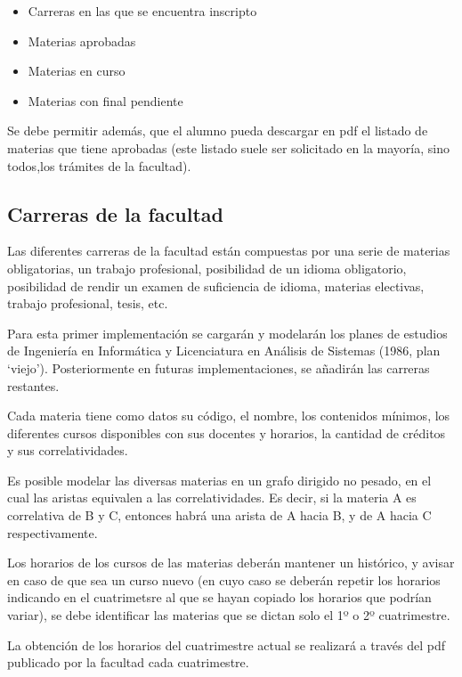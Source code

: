 \documentclass[a4paper]{article}
\begin{document}
\begin{itemize}
	\item Carreras en las que se encuentra inscripto
	\item Materias aprobadas
	\item Materias en curso
	\item Materias con final pendiente
\end{itemize}

Se debe permitir además, que el alumno pueda descargar en pdf el listado de materias que tiene aprobadas (este listado suele ser solicitado en la mayoría, sino todos,los trámites de la facultad).

\subsection{Carreras de la facultad}

Las diferentes carreras de la facultad están compuestas por una serie de materias obligatorias, un trabajo profesional, posibilidad de un idioma obligatorio, posibilidad de rendir un examen de suficiencia de idioma, materias electivas, trabajo profesional, tesis, etc.

Para esta primer implementación se cargarán y modelarán los planes de estudios de Ingeniería en Informática y Licenciatura en Análisis de Sistemas (1986, plan `viejo'). Posteriormente en futuras implementaciones, se añadirán las carreras restantes.

Cada materia tiene como datos su código, el nombre, los contenidos mínimos, los diferentes cursos disponibles con sus docentes y horarios, la cantidad de créditos y sus correlatividades.

Es posible modelar las diversas materias en un grafo dirigido no pesado, en el cual las aristas equivalen a las correlatividades. Es decir, si la materia A es correlativa de B y C, entonces habrá una arista de A hacia B, y de A hacia C respectivamente.\newline


Los horarios de los cursos de las materias deberán mantener un histórico, y avisar en caso de que sea un curso nuevo (en cuyo caso se deberán repetir los horarios indicando en el cuatrimetsre al que se hayan copiado los horarios que podrían variar), se debe identificar las materias que se dictan solo el 1º o 2º cuatrimestre.

La obtención de los horarios del cuatrimestre actual se realizará a través del pdf publicado por la facultad cada cuatrimestre.
\end{document}
